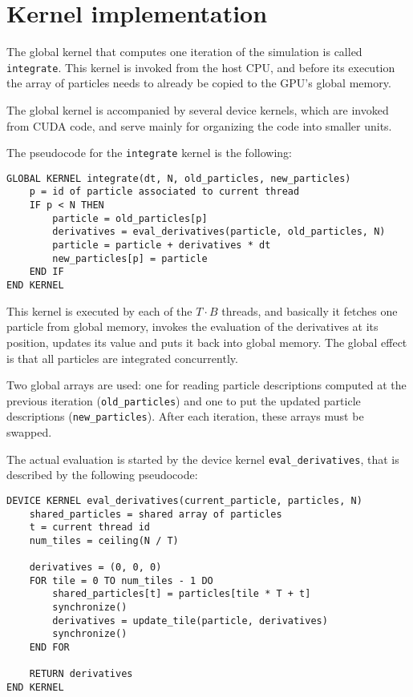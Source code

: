 \section{Kernel implementation}
\label{sec:kernel-implementation}

The global kernel that computes one iteration of the simulation
is called \verb!integrate!.
This kernel is invoked from the host CPU,
and before its execution
the array of particles needs to already be copied
to the GPU's global memory.

The global kernel is accompanied by several device kernels,
which are invoked from CUDA code, and serve mainly
for organizing the code into smaller units.

The pseudocode for the \verb!integrate! kernel is the following:
\begin{lstlisting}
GLOBAL KERNEL integrate(dt, N, old_particles, new_particles)
    p = id of particle associated to current thread
    IF p < N THEN
        particle = old_particles[p]
        derivatives = eval_derivatives(particle, old_particles, N)
        particle = particle + derivatives * dt
        new_particles[p] = particle
    END IF
END KERNEL
\end{lstlisting}

This kernel is executed by each of the \(T\cdot B\) threads,
and basically it fetches one particle from global memory,
invokes the evaluation of the derivatives at its position,
updates its value and puts it back into global memory.
The global effect is that all particles are integrated
concurrently.

Two global arrays are used: one for reading particle descriptions
computed at the previous iteration (\verb!old_particles!)
and one to put the updated particle descriptions (\verb!new_particles!).
After each iteration, these arrays must be swapped.

The actual evaluation is started by the device kernel
\verb!eval_derivatives!, that is described
by the following pseudocode:

\begin{lstlisting}
DEVICE KERNEL eval_derivatives(current_particle, particles, N)
    shared_particles = shared array of particles
    t = current thread id
    num_tiles = ceiling(N / T)

    derivatives = (0, 0, 0)
    FOR tile = 0 TO num_tiles - 1 DO
        shared_particles[t] = particles[tile * T + t]
        synchronize()
        derivatives = update_tile(particle, derivatives)
        synchronize()
    END FOR

    RETURN derivatives
END KERNEL
\end{lstlisting}


